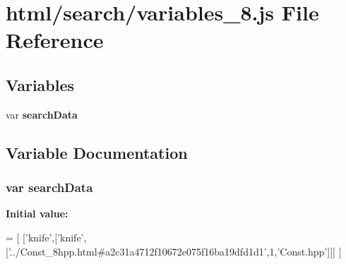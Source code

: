 \section{html/search/variables\-\_\-8.js File Reference}
\label{variables__8_8js}
\subsection*{Variables}
\begin{DoxyCompactItemize}
\item 
var {\bf search\-Data}
\end{DoxyCompactItemize}


\subsection{Variable Documentation}
\subsubsection[{search\-Data}]{\setlength{\rightskip}{0pt plus 5cm}var search\-Data}\label{variables__8_8js_ad01a7523f103d6242ef9b0451861231e}
{\bfseries Initial value\-:}
\begin{DoxyCode}
=
[
  [\textcolor{stringliteral}{'knife'},[\textcolor{stringliteral}{'knife'},[\textcolor{stringliteral}{'../Const\_8hpp.html#a2c31a4712f10672e075f16ba19dfd1d1'},1,\textcolor{stringliteral}{'Const.hpp'}]]]
]
\end{DoxyCode}
